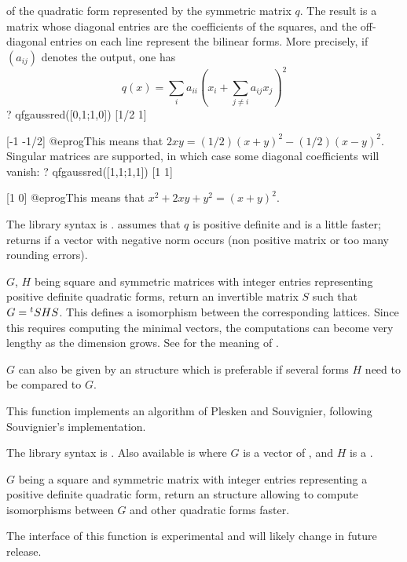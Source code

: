 \label{se:qfgaussred}
 of the
quadratic form represented by the symmetric matrix $q$. The result is a
matrix whose diagonal entries are the coefficients of the squares, and the
off-diagonal entries on each line represent the bilinear forms. More
precisely, if $(a_{ij})$ denotes the output, one has
$$ q(x) = \sum_i a_{ii} (x_i + \sum_{j \neq i} a_{ij} x_j)^2 $$
\bprog
? qfgaussred([0,1;1,0])
[1/2 1]

[-1 -1/2]
@eprog\noindent This means that $2xy = (1/2)(x+y)^2 - (1/2)(x-y)^2$.
Singular matrices are supported, in which case some diagonal coefficients
will vanish:
\bprog
? qfgaussred([1,1;1,1])
[1 1]

[1 0]
@eprog\noindent This means that $x^2 + 2xy + y^2 = (x+y)^2$.

The library syntax is .
 assumes that $q$ is
 positive definite and is a little faster; returns  if a vector
 with negative norm occurs (non positive matrix or too many rounding errors).

\label{se:qfisom}
$G$, $H$ being square and symmetric matrices with integer entries representing
positive definite quadratic forms, return an invertible matrix $S$ such that
$G={^t}S\*H\*S$. This defines a isomorphism between the corresponding lattices.
Since this requires computing the minimal vectors, the computations can
become very lengthy as the dimension grows.
See  for the meaning of .

$G$ can also be given by an  structure which is preferable if
several forms $H$ need to be compared to $G$.

This function implements an algorithm of Plesken and Souvignier, following
Souvignier's implementation.

The library syntax is .
Also available is 
where $G$ is a vector of , and $H$ is a .

\label{se:qfisominit}
$G$ being a square and symmetric matrix with integer entries representing a
positive definite quadratic form, return an  structure allowing to
compute isomorphisms between $G$ and other quadratic forms faster.

The interface of this function is experimental and will likely change in future
release.

